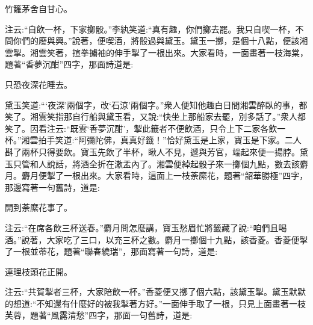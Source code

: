 \begin{poem}
    \begin{pl}竹籬茅舍自甘心。\end{pl}

\end{poem}


\begin{parag}
    注云:“自飲一杯，下家擲骰。”李紈笑道:“真有趣，你們擲去罷。我只自喫一杯，不問你們的廢與興。”說著，便喫酒，將骰過與黛玉。黛玉一擲，是個十八點，便該湘雲掣。湘雲笑著，揎拳擄袖的伸手掣了一根出來。大家看時，一面畫著一枝海棠，題著“香夢沉酣”四字，那面詩道是:
\end{parag}


\begin{poem}
    \begin{pl}只恐夜深花睡去。\end{pl}
\end{poem}


\begin{parag}
    黛玉笑道:“‘夜深’兩個字，改‘石涼’兩個字。”衆人便知他趣白日間湘雲醉臥的事，都笑了。湘雲笑指那自行船與黛玉看，又說:“快坐上那船家去罷，別多話了。”衆人都笑了。因看注云:“既雲‘香夢沉酣’，掣此籤者不便飲酒，只令上下二家各飲一杯。”湘雲拍手笑道:“阿彌陀佛，真真好籤！”恰好黛玉是上家，寶玉是下家。二人斟了兩杯只得要飲。寶玉先飲了半杯，瞅人不見，遞與芳官，端起來便一揚脖。黛玉只管和人說話，將酒全折在漱盂內了。湘雲便綽起骰子來一擲個九點，數去該麝月。麝月便掣了一根出來。大家看時，這面上一枝荼縻花，題著“韶華勝極”四字，那邊寫著一句舊詩，道是:
\end{parag}


\begin{poem}
    \begin{pl}開到荼縻花事了。\end{pl}
\end{poem}


\begin{parag}
    注云:“在席各飲三杯送春。”麝月問怎麼講，寶玉愁眉忙將籤藏了說:“咱們且喝酒。”說著，大家吃了三口，以充三杯之數。麝月一擲個十九點，該香菱。香菱便掣了一根並蒂花，題著“聯春繞瑞”，那面寫著一句詩，道是:
\end{parag}


\begin{poem}
    \begin{pl}連理枝頭花正開。\end{pl}
\end{poem}


\begin{parag}
    注云:“共賀掣者三杯，大家陪飲一杯。”香菱便又擲了個六點，該黛玉掣。黛玉默默的想道:“不知還有什麼好的被我掣著方好。”一面伸手取了一根，只見上面畫著一枝芙蓉，題著“風露清愁”四字，那面一句舊詩，道是:
\end{parag}


